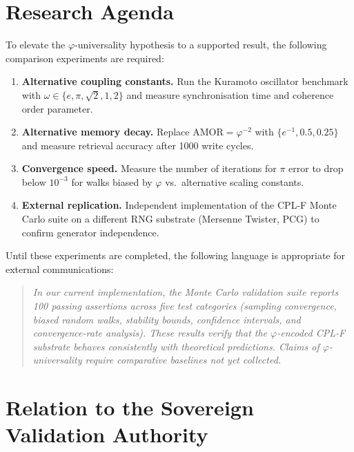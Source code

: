 \documentclass[11pt,a4paper]{article}
\begin{document}
\section{Research Agenda}
\label{sec:agenda}

To elevate the $\varphi$-universality hypothesis to a supported result, the following
comparison experiments are required:

\begin{enumerate}
  \item \textbf{Alternative coupling constants.}
    Run the Kuramoto oscillator benchmark with $\omega \in \{e, \pi, \sqrt{2}, 1, 2\}$
    and measure synchronisation time and coherence order parameter.
  \item \textbf{Alternative memory decay.}
    Replace $\text{AMOR} = \varphi^{-2}$ with $\{e^{-1}, 0.5, 0.25\}$ and measure
    retrieval accuracy after 1000 write cycles.
  \item \textbf{Convergence speed.}
    Measure the number of iterations for $\pi$ error to drop below $10^{-3}$ for walks
    biased by $\varphi$ vs.\ alternative scaling constants.
  \item \textbf{External replication.}
    Independent implementation of the CPL-F Monte Carlo suite on a different RNG
    substrate (Mersenne Twister, PCG) to confirm generator independence.
\end{enumerate}

Until these experiments are completed, the following language is appropriate for
external communications:

\begin{quote}
\emph{In our current implementation, the Monte Carlo validation suite reports 100
passing assertions across five test categories (sampling convergence, biased random
walks, stability bounds, confidence intervals, and convergence-rate analysis).  These
results verify that the $\varphi$-encoded CPL-F substrate behaves consistently with
theoretical predictions.  Claims of $\varphi$-universality require comparative baselines
not yet collected.}
\end{quote}

\section{Relation to the Sovereign Validation Authority}
\label{sec:sva}
\end{document}
